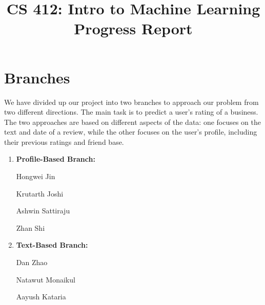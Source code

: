 \documentclass[12pt]{article}
\title{CS 412: Intro to Machine Learning\\Progress Report}
\author{}
\date{}
\begin{document}
\maketitle

\section*{Branches}
We have divided up our project into two branches to approach our problem from two different directions. The main task is to predict a user's rating of a business. The two approaches are based on different aspects of the data: one focuses on the text and date of a review, while the other focuses on the user's profile, including their previous ratings and friend base.
\begin{enumerate}
\item 
\textbf{Profile-Based Branch:}

Hongwei Jin

\noindent Krutarth Joshi

\noindent Ashwin Sattiraju

\noindent Zhan Shi


\item 
\textbf{Text-Based Branch:}

\noindent Dan Zhao

\noindent Natawut Monaikul

\noindent Aayush Kataria

\end{enumerate}
\end{document}
